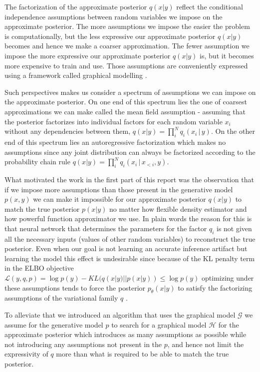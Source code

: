 \documentclass[12pt]{article}
\begin{document}
The factorization of the approximate posterior $q(x|y)$ reflect the conditional independence assumptions between random variables we impose on the approximate posterior.
The more assumptions we impose the easier the problem is computationally, but the less expressive our approximate posterior $q(x|y)$ becomes and hence we make a coarser approximation.
The fewer assumption we impose the more expressive our approximate posterior $q(x|y)$ is, but it becomes more expensive to train and use.
Those assumptions are conveniently expressed using a framework called graphical modelling \citep{KollerFriedman2009}.

Such perspectives makes us consider a spectrum of assumptions we can impose on the approximate posterior.
On one end of this spectrum lies the one of coarsest approximations we can make called the mean field assumption - assuming that the posterior factorizes into individual factors for each random variable $x_i$ without any dependencies between them, $q(x|y)=\prod^N_iq_i(x_i\,|\,y)$.
On the other end of this spectrum lies an autoregressive factorization which makes no assumptions since any joint distribution can always be factorized according to the probability chain rule $q(x|y)=\prod^N_iq_i(x_i\,|\,x_{<i},y)$.

What motivated the work in the first part of this report \citep{Webb2018} was the observation that if we impose more assumptions than those present in the generative model $p(x,y)$ we can make it impossible for our approximate posterior $q(x|y)$ to match the true posterior $p(x|y)$ no matter how flexible density estimator and how powerful function approximator we use.
In plain words the reason for this is that neural network that determines the parameters for the factor $q_i$ is not given all the necessary inputs (values of other random variables) to reconstruct the true posterior.
Even when our goal is not learning an accurate inference artifact but learning the model this effect is undesirable
since because of the KL penalty term in the ELBO objective
$\mathcal{L}(y,q,p)=\log p(y)-KL(q(x|y) || p(x|y)) \le \log p(y)$ \citep{VAE}
optimizing under these assumptions tends to force the posterior $p_\theta(x|y)$ to satisfy the factorizing assumptions of the variational family $q$ \citep{FIVO}.

To alleviate that we introduced an algorithm that uses the graphical model $\mathcal{G}$ we assume for the generative model $p$ to search for a graphical model $\mathcal{H}$ for the approximate posterior which introduces as many assumptions as possible while not introducing any assumptions not present in the $p$, and hence not limit the expressivity of $q$ more than what is required to be able to match the true posterior.
\end{document}
